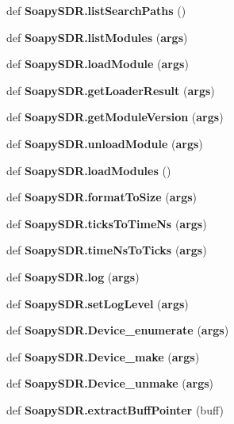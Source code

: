 \begin{DoxyCompactItemize}
def {\bf Soapy\+S\+D\+R.\+list\+Search\+Paths} ()
\item 
def {\bf Soapy\+S\+D\+R.\+list\+Modules} ({\bf args})
\item 
def {\bf Soapy\+S\+D\+R.\+load\+Module} ({\bf args})
\item 
def {\bf Soapy\+S\+D\+R.\+get\+Loader\+Result} ({\bf args})
\item 
def {\bf Soapy\+S\+D\+R.\+get\+Module\+Version} ({\bf args})
\item 
def {\bf Soapy\+S\+D\+R.\+unload\+Module} ({\bf args})
\item 
def {\bf Soapy\+S\+D\+R.\+load\+Modules} ()
\item 
def {\bf Soapy\+S\+D\+R.\+format\+To\+Size} ({\bf args})
\item 
def {\bf Soapy\+S\+D\+R.\+ticks\+To\+Time\+Ns} ({\bf args})
\item 
def {\bf Soapy\+S\+D\+R.\+time\+Ns\+To\+Ticks} ({\bf args})
\item 
def {\bf Soapy\+S\+D\+R.\+log} ({\bf args})
\item 
def {\bf Soapy\+S\+D\+R.\+set\+Log\+Level} ({\bf args})
\item 
def {\bf Soapy\+S\+D\+R.\+Device\+\_\+enumerate} ({\bf args})
\item 
def {\bf Soapy\+S\+D\+R.\+Device\+\_\+make} ({\bf args})
\item 
def {\bf Soapy\+S\+D\+R.\+Device\+\_\+unmake} ({\bf args})
\item 
def {\bf Soapy\+S\+D\+R.\+extract\+Buff\+Pointer} (buff)
\end{DoxyCompactItemize}
